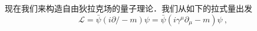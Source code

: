 
现在我们来构造自由狄拉克场的量子理论．我们从如下的拉式量出发
\begin{equation}
\mathcal L = \bar \psi (i \partial\!\!\!/ - m)\psi = \bar \psi (i \gamma^\mu \partial_\mu - m)\psi~,
\end{equation}


